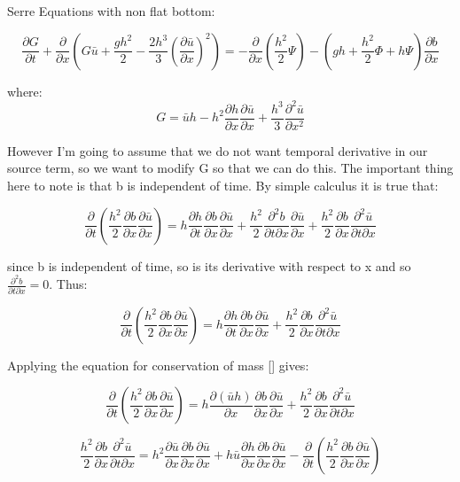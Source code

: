 \documentclass{article}
\begin{document}
Serre Equations with non flat bottom:

\[\frac{\partial G}{\partial t} + \frac{\partial}{\partial x} \left( G\bar{u} + \frac{gh^2}{2} - \frac{2h^3}{3} \left(\frac{\partial \bar{u}}{\partial x}\right)^2   \right)  = -\frac{\partial}{\partial x} \left( \frac{h^2}{2} \Psi \right)   -  \left(gh + \frac{h^2}{2}\Phi + h \Psi \right) \frac{\partial b}{\partial x}\]

where:
 \[ G = \bar{u} h - h^2 \frac{\partial h}{\partial x} \frac{\partial \bar{u}}{\partial x} + \frac{h^3}{3}\frac{\partial^2 \bar{u}}{\partial x^2} \]
 

However I'm going to assume that we do not want temporal derivative in our source term, so we want to modify G so that we can do this. The important thing here to note is that b is independent of time. By simple calculus it is true that:

\[\frac{\partial}{\partial t } \left(\frac{h^2}{2} \frac{\partial b}{\partial x}\frac{\partial \bar{u}}{\partial x}\right) = h\frac{\partial h}{\partial t}\frac{\partial b}{\partial x}\frac{\partial \bar{u}}{\partial x} + \frac{h^2}{2}\frac{\partial^2 b}{\partial t \partial x}\frac{\partial \bar{u}}{\partial x} + \frac{h^2}{2}\frac{\partial b}{\partial x}\frac{\partial^2 \bar{u}}{ \partial t \partial x} \]

since b is independent of time, so is its derivative with respect to x and so $\frac{\partial^2 b}{\partial t \partial x} = 0$. Thus:

\[\frac{\partial}{\partial t } \left(\frac{h^2}{2} \frac{\partial b}{\partial x}\frac{\partial \bar{u}}{\partial x}\right) = h\frac{\partial h}{\partial t}\frac{\partial b}{\partial x}\frac{\partial \bar{u}}{\partial x}  + \frac{h^2}{2}\frac{\partial b}{\partial x}\frac{\partial^2 \bar{u}}{ \partial t \partial x} \]

Applying  the equation for conservation of mass [] gives:

\[\frac{\partial}{\partial t } \left(\frac{h^2}{2} \frac{\partial b}{\partial x}\frac{\partial \bar{u}}{\partial x}\right) = h\frac{\partial (\bar{u}h)}{\partial x}\frac{\partial b}{\partial x}\frac{\partial \bar{u}}{\partial x}  + \frac{h^2}{2}\frac{\partial b}{\partial x}\frac{\partial^2 \bar{u}}{ \partial t \partial x} \]

\[\frac{h^2}{2}\frac{\partial b}{\partial x}\frac{\partial^2 \bar{u}}{ \partial t \partial x} =  h^2\frac{\partial \bar{u}}{\partial x}\frac{\partial b}{\partial x}\frac{\partial \bar{u}}{\partial x} + h \bar{u}\frac{\partial h}{\partial x}\frac{\partial b}{\partial x}\frac{\partial \bar{u}}{\partial x} - \frac{\partial}{\partial t } \left(\frac{h^2}{2} \frac{\partial b}{\partial x}\frac{\partial \bar{u}}{\partial x}\right) \]
\end{document}

